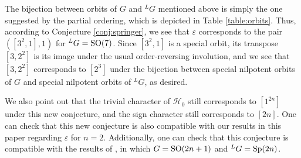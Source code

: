 \documentclass[11pt,letterpaper]{article}
\newcommand{\calH}{\mathcal{H}} %
\newcommand{\calD}{\mathcal{D}}
\newcommand{\ve}{\varepsilon}
\newcommand{\goth}{\mathfrak}
\newcommand{\SO}{\textup{SO}}
\newcommand{\Sp}{\textup{Sp}}
\newcommand{\calHom}{\textup{Hom}}
\newcommand{\Ind}{\textup{Ind}}
\newcommand{\ind}{\textup{ind}}
\theoremstyle{remark}
\numberwithin{equation}{section}
\begin{document}
The bijection between orbits of $G$ and $^LG$ mentioned above is simply the one suggested by the partial ordering, which is depicted in Table \eqref{table:orbits}. Thus, according to Conjecture \ref{conj:springer}, we see that $\ve$ corresponds to the pair $([3^2,1],1)$ for $^LG = \SO(7)$. Since $[3^2,1]$ is a special orbit, its transpose $[3,2^2]$ is its image under the usual order-reversing involution, and we see that $[3,2^2]$ corresponds to $[2^3]$ under the bijection between special nilpotent orbits of $G$ and special nilpotent orbits of $^LG$, as desired.

We also point out that the trivial character of $\calH_0$ still corresponds to $[1^{2n}]$ under this new conjecture, and the sign character still corresponds to $[2n]$. One can check that this new conjecture is also compatible with our results in this paper regarding $\ve$ for $n=2$. Additionally, one can check that this conjecture is compatible with the results of \cite{BBF2}, in which $G = \SO(2n+1)$ and $^LG = \Sp(2n)$.

\begin{comment}

Note that the gGGr, $\Gamma_{A,\alpha}$, whose $J$-fixed vectors contain $\Ind_{\calH_0}^{\calH} \tau$ in Conjecture \ref{conj:springer} is built, in part, from the trivial representation of $Z_L(A)$. That the gGGr's that function as models of the universal principal series must be induced from representations that are trivial on $Z_L(A)$ is suggested in part by results such as Proposition \ref{sgngggr}, which we prove using Mackey theory:

\begin{proof}[Proof of Proposition \ref{sgngggr}]
Let $\Gamma_{A,\alpha} = \ind_{\overline{U}_AZ_L(\goth{O})}^G \widetilde{\eta}_{A,\alpha}$. Mimicking our argument for the uniqueness of the Bessel functional, $\calHom_G(\ind_B^G \chi_{\textup{univ}}^{-1}, \Gamma_{A,\alpha})$ is isomorphic to the subspace $\calD_{\widetilde{\eta}_{A,\alpha}, \chi_{\textup{univ}}^{-1}}(G,R)$ of $R$ distributions $\Delta$ satisfying \eqref{mackey}. As in the case of the Bessel functional, we can see that the dimension of this subspace is determined by the number of double cosets in the decomposition of $G$ given in \ref{prop:bruhat2n} that can support such a distribution $\Delta$. As before, we see that a double coset $Bw\overline{U}_AZ_L(\goth{o})$ with $w \in W/W_L$ is only able to support such a distribution if the compatibility condition $$\chi_{\textup{univ}}^{-1}(b) = \widetilde{\eta}_{A,\alpha}(w^{-1}bw)$$ holds for all $b \in B$ with $h= w^{-1}bw \in \overline{U}_AZ_L(\goth{o})$. 

However...

\end{proof}
\end{comment} 
\end{document}
